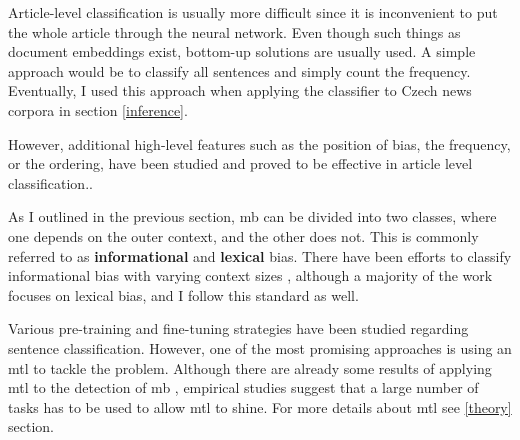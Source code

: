 Article-level classification is usually more difficult since it is inconvenient to put the whole article through the neural network. Even though such things as document embeddings exist, bottom-up solutions are usually used. A simple approach would be to classify all sentences and simply count the frequency. Eventually, I used this approach when applying the classifier to Czech news corpora in section \ref{inference}.

However, additional high-level features such as the position of bias, the frequency, or the ordering, have been studied and proved to be effective in article level classification.\cite{chen2020detecting,chen-etal-2020-analyzing}.

As I outlined in the previous section, \gls{mb} can be divided into two classes, where one depends on the outer context, and the other does not. This is commonly referred to as \textbf{informational} and \textbf{lexical} bias. There have been efforts to classify informational bias with varying context sizes \cite{van2020context}, although a majority of the work focuses on lexical bias, and I follow this standard as well.

Various pre-training and fine-tuning strategies have been studied regarding sentence classification. However, one of the most promising approaches is using an \Gls{mtl} to tackle the problem. Although there are already some results of applying \Gls{mtl} to the detection of \gls{mb} \cite{lee2021unifying,spindeexploiting}, empirical studies suggest that a large number of tasks has to be used to allow \Gls{mtl} to shine. For more details about \gls{mtl} see \ref{theory} section.